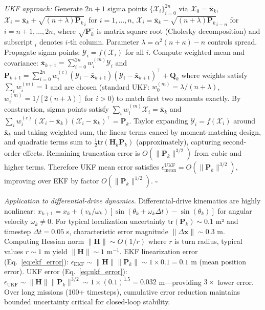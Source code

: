 \documentclass[pdflatex,sn-nature]{sn-jnl}%
\begin{document}
\textit{UKF approach:} Generate $2n+1$ sigma points $\{\mathcal{X}_i\}_{i=0}^{2n}$ via $\mathcal{X}_0 = \bar{\mathbf{x}}_k$, $\mathcal{X}_i = \bar{\mathbf{x}}_k + \sqrt{(n+\lambda)\mathbf{P}_k}_i$ for $i=1,\ldots,n$, $\mathcal{X}_i = \bar{\mathbf{x}}_k - \sqrt{(n+\lambda)\mathbf{P}_k}_{i-n}$ for $i=n+1,\ldots,2n$, where $\sqrt{\mathbf{P}_k}$ is matrix square root (Cholesky decomposition) and subscript $_i$ denotes $i$-th column. Parameter $\lambda = \alpha^2(n+\kappa)-n$ controls spread. Propagate sigma points: $\mathcal{Y}_i = f(\mathcal{X}_i)$ for all $i$. Compute weighted mean and covariance: $\bar{\mathbf{x}}_{k+1} = \sum_{i=0}^{2n} w_i^{(m)} \mathcal{Y}_i$ and $\mathbf{P}_{k+1} = \sum_{i=0}^{2n} w_i^{(c)} (\mathcal{Y}_i - \bar{\mathbf{x}}_{k+1})(\mathcal{Y}_i - \bar{\mathbf{x}}_{k+1})^\top + \mathbf{Q}_k$ where weights satisfy $\sum_i w_i^{(m)} = 1$ and are chosen (standard UKF: $w_0^{(m)} = \lambda/(n+\lambda)$, $w_i^{(m)} = 1/[2(n+\lambda)]$ for $i>0$) to match first two moments exactly. By construction, sigma points satisfy $\sum_i w_i^{(m)} \mathcal{X}_i = \bar{\mathbf{x}}_k$ and $\sum_i w_i^{(c)} (\mathcal{X}_i - \bar{\mathbf{x}}_k)(\mathcal{X}_i - \bar{\mathbf{x}}_k)^\top = \mathbf{P}_k$. Taylor expanding $\mathcal{Y}_i = f(\mathcal{X}_i)$ around $\bar{\mathbf{x}}_k$ and taking weighted sum, the linear terms cancel by moment-matching design, and quadratic terms sum to $\frac{1}{2}\text{tr}(\mathbf{H}_k \mathbf{P}_k)$ (approximately), capturing second-order effects. Remaining truncation error is $O(\|\mathbf{P}_k\|^{3/2})$ from cubic and higher terms. Therefore UKF mean error satisfies $\epsilon_{\text{mean}}^{\text{UKF}} = O(\|\mathbf{P}_k\|^{3/2})$, improving over EKF by factor $O(\|\mathbf{P}_k\|^{1/2})$. $\square$

\textit{Application to differential-drive dynamics.} Differential-drive kinematics are highly nonlinear: $x_{k+1} = x_k + (v_k/\omega_k)[\sin(\theta_k + \omega_k \Delta t) - \sin(\theta_k)]$ for angular velocity $\omega_k \neq 0$. For typical localization uncertainty $\text{tr}(\mathbf{P}_k) \sim 0.1$ m² and timestep $\Delta t = 0.05$ s, characteristic error magnitude $\|\Delta \mathbf{x}\| \sim 0.3$ m. Computing Hessian norm $\|\mathbf{H}\| \sim O(1/r)$ where $r$ is turn radius, typical values $r \sim 1$ m yield $\|\mathbf{H}\| \sim 1$ m$^{-1}$. EKF linearization error (Eq.~\ref{eq:ekf_error}): $\epsilon_{\text{EKF}} \sim \|\mathbf{H}\| \|\mathbf{P}_k\| \sim 1 \times 0.1 = 0.1$ m (mean position error). UKF error (Eq.~\ref{eq:ukf_error}): $\epsilon_{\text{UKF}} \sim \|\mathbf{H}\| \|\mathbf{P}_k\|^{3/2} \sim 1 \times (0.1)^{1.5} = 0.032$ m—providing $3\times$ lower error. Over long missions (100+ timesteps), cumulative error reduction maintains bounded uncertainty critical for closed-loop stability.
\end{document}
